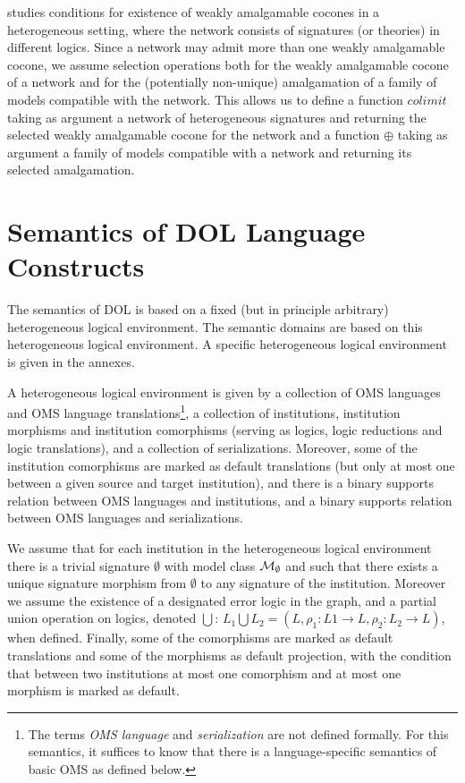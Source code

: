 \documentclass[10pt,fleqn,%
\ifpretendfinal
final%
\else
draft%
\fi,
]{scrreprt}
\newcommand*{\termref}[1]{\index{#1}#1\xspace}
\newcommand{\sclause}[1]{\section{#1}}
\begin{document}
\cite{weakcol} studies conditions for existence of weakly amalgamable cocones
in a heterogeneous setting, where the network consists of signatures (or theories)
in different logics. Since a network may admit more than one weakly amalgamable cocone,
we assume selection operations both for the weakly amalgamable cocone of a network 
and for the (potentially non-unique) amalgamation of a family of models compatible with the
network. This allows us to define a function
$colimit$ taking as argument a network of heterogeneous signatures and
returning the selected weakly amalgamable cocone for the network and
a function $\oplus$ taking as argument a family of models compatible with a network
and returning its selected amalgamation.


\sclause{Semantics of DOL Language Constructs}\label{c:direct-sematics}

The semantics of DOL is based on a fixed (but in principle arbitrary) heterogeneous logical 
environment.  The semantic domains are based on this heterogeneous logical environment. 
A specific heterogeneous logical environment is given in the annexes.

A heterogeneous logical environment is given by a collection of
OMS languages and OMS language translations\footnote{The
  terms \emph{OMS language} and \emph{serialization} are not
  defined formally. For this semantics, it suffices to know that there
  is a language-specific semantics of basic OMS as defined
  below.}, a collection of institutions, \termref{institution} morphisms and
institution comorphisms (serving as logics, logic reductions and logic
translations), and a collection of serializations. Moreover, some of the institution comorphisms are marked as default translations (but only at most one between a given source and target institution), and there is
a binary supports relation between OMS languages and institutions,
and a binary supports relation between OMS languages and
serializations. 

We assume that for each institution in the heterogeneous logical environment there is a trivial signature
$\emptyset$ with model class ${\cal M}_\emptyset$ and such that there exists a unique signature morphism
from $\emptyset$ to any signature of the institution. Moreover we assume the existence of a designated 
error logic in the graph, and a partial union operation on logics, denoted $\bigcup$: 
$L_1 \bigcup L_2 = (L, \rho_1:L1 \to L, \rho_2 : L_2 \to L)$, when defined. Finally, some of the comorphisms are marked as default translations and some of the morphisms as default projection, with the condition that between two institutions at most one comorphism 
and at most one morphism is marked as default.
\end{document}
